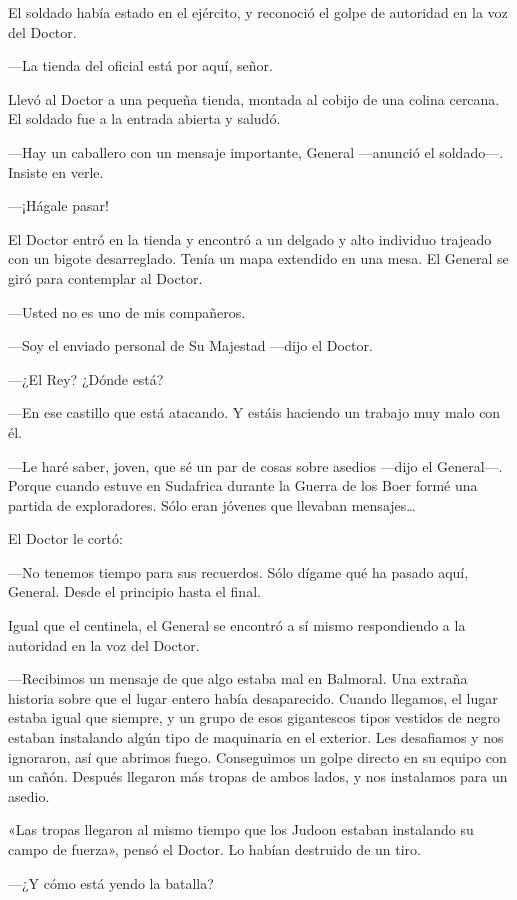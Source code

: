 El soldado había estado en el ejército, y reconoció el golpe de
autoridad en la voz del Doctor.

---La tienda del oficial está por aquí, señor.

Llevó al Doctor a una pequeña tienda, montada al cobijo de una colina
cercana. El soldado fue a la entrada abierta y saludó.

---Hay un caballero con un mensaje importante, General ---anunció el
soldado---. Insiste en verle.

---¡Hágale pasar!

El Doctor entró en la tienda y encontró a un delgado y alto individuo
trajeado con un bigote desarreglado. Tenía un mapa extendido en una
mesa. El General se giró para contemplar al Doctor.

---Usted no es uno de mis compañeros.

---Soy el enviado personal de Su Majestad ---dijo el Doctor.

---¿El Rey? ¿Dónde está?

---En ese castillo que está atacando. Y estáis haciendo un trabajo muy
malo con él.

---Le haré saber, joven, que sé un par de cosas sobre asedios ---dijo el
General---. Porque cuando estuve en Sudafrica durante la Guerra de los
Boer formé una partida de exploradores. Sólo eran jóvenes que llevaban
mensajes\ldots{}

El Doctor le cortó:

---No tenemos tiempo para sus recuerdos. Sólo dígame qué ha pasado aquí,
General. Desde el principio hasta el final.

Igual que el centinela, el General se encontró a sí mismo respondiendo a
la autoridad en la voz del Doctor.

---Recibimos un mensaje de que algo estaba mal en Balmoral. Una extraña
historia sobre que el lugar entero había desaparecido. Cuando llegamos,
el lugar estaba igual que siempre, y un grupo de esos gigantescos tipos
vestidos de negro estaban instalando algún tipo de maquinaria en el
exterior. Les desafiamos y nos ignoraron, así que abrimos fuego.
Conseguimos un golpe directo en su equipo con un cañón. Después llegaron
más tropas de ambos lados, y nos instalamos para un asedio.

«Las tropas llegaron al mismo tiempo que los Judoon estaban instalando
su campo de fuerza», pensó el Doctor. Lo habían destruido de un tiro.

---¿Y cómo está yendo la batalla?

